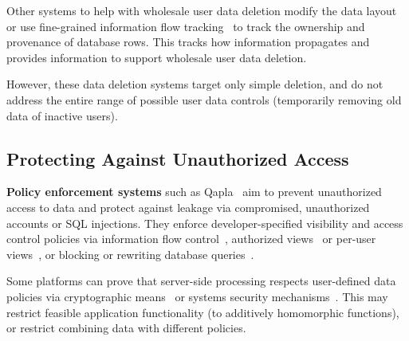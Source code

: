 Other systems to help with wholesale user data deletion modify the data layout~\cite{usershards} or use fine-grained
information flow tracking~\cite{schengendb} to track the ownership and
provenance of database rows.
%
This tracks how information propagates and provides information to support
wholesale user data deletion.

%
However, these data deletion systems target only simple deletion, and do not address
the entire range of possible user data controls (\eg temporarily removing old data of
inactive users). 

%
%
%

%
\subsection{Protecting Against Unauthorized Access} 
\textbf{Policy enforcement systems} such as Qapla~\cite{qapla}
aim to prevent
unauthorized access to data and protect against leakage via compromised,
unauthorized accounts or SQL injections.
%
They enforce developer-specified visibility and access control policies via
information flow control~\cite{static, jeeves, jif, hails, ifdb}, authorized
views~\cite{oracle} or per-user views~\cite{multiverse}, or blocking or
rewriting database queries~\cite{blockaid, qapla, sieve}.
%
%
%
%
%

%
Some platforms can prove that server-side processing respects
user-defined data policies via cryptographic means~\cite{zeph} or
systems security mechanisms~\cite{riverbed}.
%
This may restrict feasible application functionality (\eg to additively
homomorphic functions), or restrict combining data with different policies.
%
%

